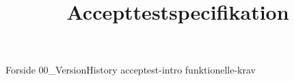 \documentclass[a4paper,openany]{memoir}
\title{Accepttestspecifikation}
\begin{document}
	{Forside}  \newpage
	\tableofcontents\thispagestyle{fancy}
	{00_VersionHistory}  \newpage
	{acceptest-intro}  \newpage
	{funktionelle-krav}  \newpage

	 {}
	\printbibliography
\end{document}
